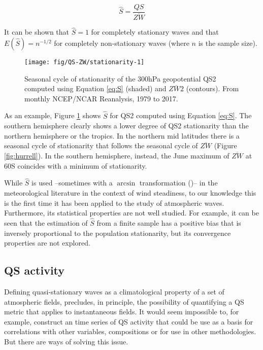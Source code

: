 \documentclass[draft,linenumbers]{agujournal2018}
\begin{document}
\begin{linenomath*}
\begin{equation}\label{eq:S}
\hat{S} =  \frac{QS}{\overline{ZW}}
\end{equation}
\end{linenomath*}

It can be shown that \(\hat{S} = 1\) for completely stationary waves and
that \(E(\hat{S}) = n^{-1/2}\) for completely non-stationary waves
(where \(n\) is the sample size).

\begin{figure}[h]

{\centering \texttt{[image: fig/QS-ZW/stationarity-1]} 

}

\caption{Seasonal cycle of stationarity of the 300hPa geopotential QS2 computed using Equation \ref{eq:S} (shaded) and $\overline{ZW2}$ (contours). From monthly NCEP/NCAR Reanalysis, 1979 to 2017.}\label{fig:stationarity}
\end{figure}

As an example, Figure \ref{fig:stationarity} shows \(\hat{S}\) for QS2
computed using Equation \ref{eq:S}. The southern hemisphere clearly
shows a lower degree of QS2 stationarity than the northern hemisphere or
the tropics. In the northern mid latitudes there is a seasonal cycle of
stationarity that follows the seasonal cycle of \(\overline{ZW}\)
(Figure \ref{fig:hurrell}). In the southern hemisphere, instead, the
June maximum of \(\overline{ZW}\) at 60\degree S coincides with a
minimum of stationarity.

While \(\hat{S}\) is used --sometimes with a \(\arcsin\) transformation
(\citet{Singer1967})-- in the meteorological literature in the context
of wind steadiness, to our knowledge this is the first time it has been
applied to the study of atmospheric waves. Furthermore, its statistical
properties are not well studied. For example, it can be seen that the
estimation of \(\hat{S}\) from a finite sample has a positive bias that
is inversely proportional to the population stationarity, but its
convergence properties are not explored.

\subsection{QS activity}

Defining quasi-stationary waves as a climatological property of a set of
atmospheric fields, precludes, in principle, the possibility of
quantifying a QS metric that applies to instantaneous fields. It would
seem impossible to, for example, construct an time series of QS activity
that could be use as a basis for correlations with other variables,
compositions or for use in other methodologies. But there are ways of
solving this issue.
\end{document}
